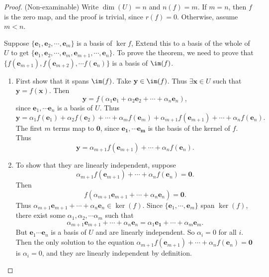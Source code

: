 \documentclass[a4paper]{article}
\begin{document}
\begin{proof}
  (Non-examinable) Write $\dim(U) = n$ and $n(f) = m$. If $m = n$, then $f$ is the zero map, and the proof is trivial, since $r(f) = 0 $. Otherwise, assume $m < n$.

  Suppose $\{\mathbf{e}_1, \mathbf{e}_2,\cdots, \mathbf{e}_m\}$ is a basis of $\ker f$, Extend this to a basis of the whole of $U$ to get $\{\mathbf{e}_1, \mathbf{e}_2, \cdots, \mathbf{e}_m, \mathbf{e}_{m+1}, \cdots, \mathbf{e}_n\}$. To prove the theorem, we need to prove that $\{f(\mathbf{e}_{m+1}), f(\mathbf{e}_{m + 2}), \cdots f({\mathbf{e}_n})\}$ is a basis of $\im (f)$.
  \begin{enumerate}
    \item First show that it spans $\im (f)$. Take $\mathbf{y}\in \im(f)$. Thus $\exists \mathbf{x}\in U$ such that $\mathbf{y} = f(\mathbf{x})$. Then
      \[
        \mathbf{y} = f(\alpha_1\mathbf{e}_1 + \alpha_2\mathbf{e}_2 + \cdots + \alpha_n \mathbf{e}_n),
      \]
      since $\mathbf{e}_1, \cdots \mathbf{e}_n$ is a basis of $U$. Thus
      \[
        \mathbf{y} = \alpha_1f(\mathbf{e}_1) + \alpha_2f(\mathbf{e}_2) + \cdots + \alpha_m f(\mathbf{e}_m) + \alpha_{m + 1}f(\mathbf{e}_{m + 1}) + \cdots + \alpha_nf(\mathbf{e}_n).
      \]
      The first $m$ terms map to $\mathbf{0}$, since $\mathbf{e_1, \cdots e_m}$ is the basis of the kernel of $f$. Thus
      \[
        \mathbf{y} = \alpha_{m + 1} f(\mathbf{e}_{m + 1}) + \cdots + \alpha_n f(\mathbf{e}_n).
      \]
    \item To show that they are linearly independent, suppose
      \[
        \alpha_{m + 1} f(\mathbf{e}_{m + 1}) + \cdots + \alpha_n f(\mathbf{e}_n) = \mathbf{0}.
      \]
      Then
      \[
        f(\alpha_{m + 1}\mathbf{e}_{m + 1} + \cdots + \alpha_n\mathbf{e}_n) = \mathbf{0}.
      \]
      Thus $\alpha_{m + 1}\mathbf{e}_{m + 1} + \cdots + \alpha_n\mathbf{e}_n\in \ker (f)$. Since $\{\mathbf{e}_1, \cdots, \mathbf{e}_m\}$ span $\ker (f)$, there exist some $\alpha_1, \alpha_2, \cdots \alpha_m$ such that
      \[
        \alpha_{m + 1}\mathbf{e}_{m + 1} + \cdots + \alpha_n\mathbf{e}_n = \alpha_1\mathbf{e_1} + \cdots + \alpha_m\mathbf{e}_m.
      \]
      But $\mathbf{e}_1\cdots \mathbf{e}_n$ is a basis of $U$ and are linearly independent. So $\alpha_i = 0$ for all $i$. Then the only solution to the equation $\alpha_{m + 1} f(\mathbf{e}_{m + 1}) + \cdots + \alpha_n f(\mathbf{e}_n) = \mathbf{0}$ is $\alpha_i = 0$, and they are linearly independent by definition. \qedhere
  \end{enumerate}
\end{proof}
\end{document}
